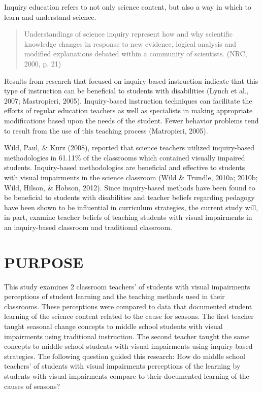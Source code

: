 \documentclass[11.5pt]{sig-alternate} %
\begin{document}
\begin{large}
Inquiry education refers to not only science content, but also a way in which to learn and understand science.

\begin{quote}
Understandings of science inquiry represent how and why scientific knowledge changes in response to new evidence, logical analysis and modified explanations debated within a community of scientists. (NRC, 2000, p. 21)
\end{quote}
	
Results from research that focused on inquiry-based instruction indicate that this type of instruction can be beneficial to students with disabilities (Lynch et al., 2007; Mastropieri, 2005). Inquiry-based instruction techniques can facilitate the efforts of regular education teachers as well as specialists in making appropriate modifications based upon the needs of the student. Fewer behavior problems tend to result from the use of this teaching process (Matropieri, 2005).  

Wild, Paul, \& Kurz (2008), reported that science teachers utilized inquiry-based methodologies in 61.11\% of the classrooms which contained visually impaired students. Inquiry-based methodologies are beneficial and effective to students with visual impairments in the science classroom (Wild \& Trundle, 2010a; 2010b; Wild, Hilson, \& Hobson, 2012).  Since inquiry-based methods have been found to be beneficial to students with disabilities and teacher beliefs regarding pedagogy have been shown to be influential in curriculum strategies, the current study will, in part, examine teacher beliefs of teaching students with visual impairments in an inquiry-based classroom and traditional classroom.  

\section*{PURPOSE}

This study examines 2 classroom teachers’ of students with visual impairments perceptions of student learning and the teaching methods used in their classrooms.  These perceptions were compared to data that documented student learning of the science content related to the cause for seasons.  The first teacher taught seasonal change concepts to middle school students with visual impairments using traditional instruction.  The second teacher taught the same concepts to middle school students with visual impairments using inquiry-based strategies.  The following question guided this research: How do middle school teachers’ of students with visual impairments perceptions of the learning by students with visual impairments compare to their documented learning of the causes of seasons?


\end{large}
\end{document}
